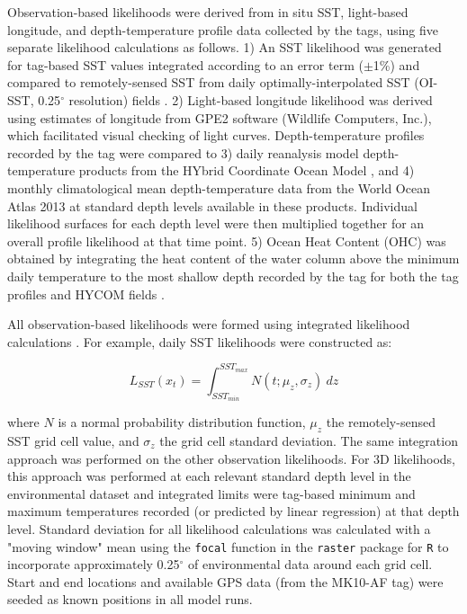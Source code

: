 Observation-based likelihoods were derived from in situ SST, light-based longitude, and depth-temperature profile data collected by the tags, using five separate likelihood calculations as follows. 1) An SST likelihood was generated for tag-based SST values integrated according to an error term ($\pm$1\%) and compared to remotely-sensed SST from daily optimally-interpolated SST (OI-SST, 0.25$^{\circ}$ resolution) fields \citep{Reynolds2007, Banzon2016}. 2) Light-based longitude likelihood was derived using estimates of longitude from GPE2 software (Wildlife Computers, Inc.), which facilitated visual checking of light curves. Depth-temperature profiles recorded by the tag were compared to 3) daily reanalysis model depth-temperature products from the HYbrid Coordinate Ocean Model \citep[HYCOM, 0.08$^{\circ}$ resolution; ][]{Bleck2002, Chassignet2007}, and 4) monthly climatological mean depth-temperature data from the World Ocean Atlas 2013 \citep[0.25$^{\circ}$ resolution; ][]{Locarnini2013} at standard depth levels available in these products. Individual likelihood surfaces for each depth level were then multiplied together for an overall profile likelihood at that time point. 5) Ocean Heat Content (OHC) was obtained by integrating the heat content of the water column above the minimum daily temperature to the most shallow depth recorded by the tag for both the tag profiles and HYCOM fields \citep{Luo2015}. 

All observation-based likelihoods were formed using integrated likelihood calculations \citep{LeBris2013a}. For example, daily SST likelihoods were constructed as:

\begin{equation}
\label{eq:c3e2}
L_{SST}(x_t) = \int_{SST_{min}}^{SST_{max}} N(t; \mu_z, \sigma_z)~dz
\end{equation}

where $N$ is a normal probability distribution function, $\mu_z$ the remotely-sensed SST grid cell value, and $\sigma_z$ the grid cell standard deviation. The same integration approach was performed on the other observation likelihoods. For 3D likelihoods, this approach was performed at each relevant standard depth level in the environmental dataset and integrated limits were tag-based minimum and maximum temperatures recorded (or predicted by linear regression) at that depth level. Standard deviation for all likelihood calculations was calculated with a "moving window" mean using the \texttt{focal} function in the \texttt{raster} package \citep{Hijmans2016} for \texttt{R} to incorporate approximately 0.25$^{\circ}$ of environmental data around each grid cell. Start and end locations and available GPS data (from the MK10-AF tag) were seeded as known positions in all model runs.

